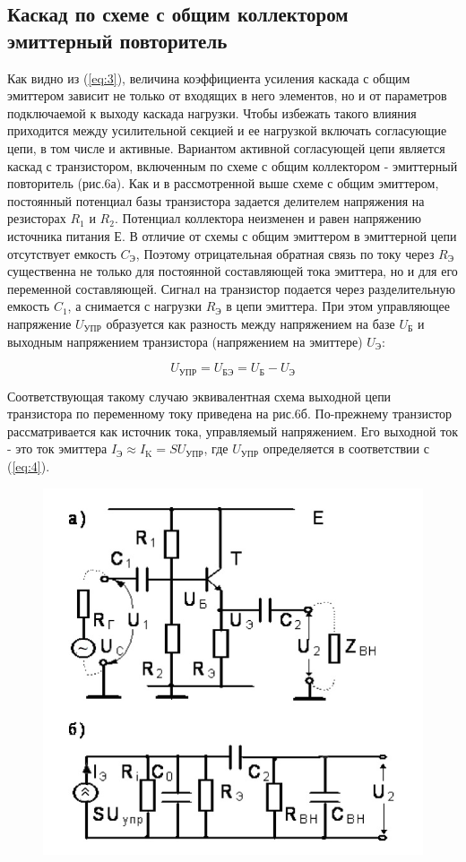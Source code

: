 \subsection{\textbf{Каскад по схеме с общим коллектором эмиттерный повторитель}}
Как видно из (\ref{eq:3}), величина коэффициента усиления каскада с общим эмиттером зависит не только от входящих в него элементов, но и от параметров подключаемой к выходу каскада нагрузки. Чтобы избежать такого влияния приходится между усилительной секцией и ее нагрузкой включать согласующие цепи, в том числе и активные. Вариантом активной согласующей цепи является каскад с транзистором, включенным по схеме с общим коллектором - эмиттерный повторитель (рис.6а). Как и в рассмотренной выше схеме с общим эмиттером, постоянный потенциал базы транзистора задается делителем напряжения на резисторах $R_1$ и $R_2$. Потенциал коллектора неизменен и равен напряжению источника питания Е. В отличие от схемы с общим эмиттером в эмиттерной цепи отсутствует емкость $C_{\text{Э}}$, Поэтому отрицательная обратная связь по току через $R_{\text{Э}}$ существенна не только для постоянной составляющей тока эмиттера, но и для его переменной составляющей. Сигнал на транзистор подается через разделительную емкость $C_1$, а снимается с нагрузки $R_{\text{Э}}$ в цепи эмиттера. При этом управляющее напряжение $U_{\text{УПР}}$ образуется как разность между напряжением на базе $U_{\text{Б}}$ и выходным напряжением транзистора (напряжением на эмиттере) $U_{\text{Э}}$:

\begin{equation}
	U_{\text{УПР}}=U_{\text{БЭ}}=U_{\text{Б}}-U_{\text{Э}}
	\label{eq:4}
\end{equation}

Соответствующая такому случаю эквивалентная схема выходной цепи транзистора по переменному току приведена на рис.6б. По-прежнему транзистор рассматривается как источник тока, управляемый напряжением. Его выходной ток - это ток эмиттера $I_{\text{Э}} \approx I_{\text{K}}=SU_{\text{УПР}}$, где $U_{\text{УПР}}$ определяется в соответствии с (\ref{eq:4}).

\begin{figure}[h!]
	\centering
	\includegraphics[width=0.6\linewidth]{fig/fig6}
	\caption{}
	\label{fig:6}
\end{figure}

